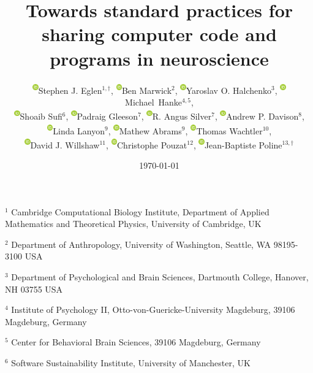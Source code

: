 \documentclass[11pt]{article}
\begin{document}
\onehalfspacing

\newcommand{\orcid}[1]{\textsuperscript{\href{https://orcid.org/#1}
  {\includegraphics[width=2.5mm]{orcid_128x128.png}}}}

\title{Towards standard practices for sharing computer code and programs in neuroscience}

\author{\orcid{0000-0001-8607-8025}Stephen J. Eglen$^{1,\dagger}$, 
  \orcid{0000-0001-7879-4531}Ben Marwick${^2}$, 
  \orcid{0000-0003-3456-2493}Yaroslav O. Halchenko${^3}$, 
  \orcid{0000-0001-6398-6370}Michael~Hanke${^{4,5}}$,
  \\
  \orcid{0000-0001-6390-2616}Shoaib Sufi$^6$,
  \orcid{0000-0001-5963-8576}Padraig Gleeson$^7$, 
  \orcid{0000-0002-5480-6638}R. Angus Silver$^7$,
  \orcid{0000-0002-4793-7541}Andrew P. Davison$^8$,
  \\
  \orcid{0000-0002-0885-1825}Linda Lanyon$^9$,
  \orcid{0000-0001-9438-9691}Mathew Abrams$^9$,
  \orcid{0000-0003-2015-6590}Thomas Wachtler$^{10}$,
  \\
  \orcid{0000-0003-3814-7529}David J. Willshaw$^{11}$,
  \orcid{0000-0002-2844-8099}Christophe Pouzat$^{12}$,
  \orcid{0000-0002-9794-749X}Jean-Baptiste Poline$^{13,\dagger}$}
\date{\today}
\maketitle

\noindent $^{1}$ 
Cambridge Computational Biology Institute,
Department of Applied Mathematics and Theoretical Physics,
University of Cambridge, UK

\noindent $^{2}$ 
Department of Anthropology,
University of Washington,
Seattle, WA 98195-3100 USA 

\noindent $^{3}$
Department of Psychological and Brain Sciences,
Dartmouth College,
Hanover, NH 03755 USA

\noindent $^{4}$
Institute of Psychology II, Otto-von-Guericke-University Magdeburg, 39106 Magdeburg, Germany

\noindent $^{5}$
Center for Behavioral Brain Sciences, 39106 Magdeburg, Germany

\noindent $^{6}$
Software Sustainability Institute, University of Manchester, UK
\end{document}
